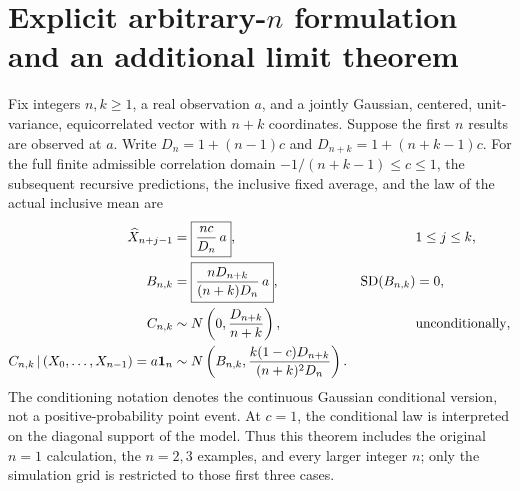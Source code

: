 \section{Explicit arbitrary-\texorpdfstring{\(n\)}{n} formulation and an additional limit theorem}
\begin{theorem}
\label{thm:arbitrary-n-equal-starts}
Fix integers \(n,k\geq1\), a real observation \(a\), and a jointly
Gaussian, centered, unit-variance, equicorrelated vector with \(n+k\)
coordinates. Suppose the first \(n\) results are observed at \(a\).
Write \(D_n=1+(n-1)c\) and \(D_{n+k}=1+(n+k-1)c\). For the full finite
admissible correlation domain
\(-1/(n+k-1)\leq c\leq1\), the subsequent recursive predictions,
the inclusive fixed average, and the law of the actual inclusive mean are
\begin{align}
 \widehat X_{n+j-1}
   &=\boxed{\frac{nc}{D_n}\,a},
   &&1\leq j\leq k, \label{eq:general-n-prediction}\\
 B_{n,k}
   &=\boxed{\frac{nD_{n+k}}{(n+k)D_n}\,a},
   &\operatorname{SD}(B_{n,k})&=0,
      \label{eq:general-n-average}\\
 C_{n,k}
   &\sim N\left(0,\frac{D_{n+k}}{n+k}\right),
   &&\text{unconditionally},\label{eq:general-n-population}\\
 C_{n,k}\,\vert\,(X_0,\ldots,X_{n-1})=a\mathbf{1}_n
   &\sim N\left(B_{n,k},
       \frac{k(1-c)D_{n+k}}{(n+k)^2D_n}\right).
   &&\label{eq:general-n-conditional}
\end{align}
The conditioning notation denotes the continuous Gaussian conditional
version, not a positive-probability point event. At \(c=1\), the
conditional law is interpreted on the diagonal support of the model.
Thus this theorem includes the original \(n=1\) calculation, the \(n=2,3\)
examples, and every larger integer \(n\); only the simulation grid is
restricted to those first three cases.
\end{theorem}
